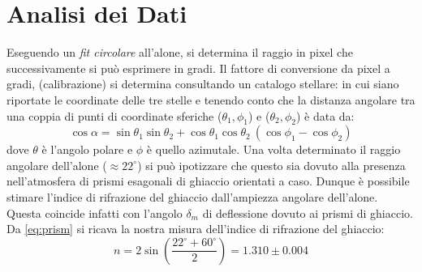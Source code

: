\documentclass{report}[a4paper,11pt]
\begin{document}
\section{Analisi dei Dati}
Eseguendo un \emph{fit circolare} all'alone, si determina il raggio in pixel che successivamente si pu\`o esprimere in gradi. Il fattore di conversione da pixel a gradi, (calibrazione) si determina consultando un catalogo stellare: \cite{stellarium} in cui siano riportate le coordinate delle tre stelle e tenendo conto che la distanza angolare tra una coppia di punti di coordinate sferiche ($\theta_1,\phi_1$) e ($\theta_2,\phi_2$) \`e data da:
\begin{equation}\label{eq: sphere}
\cos\alpha = \sin\theta_1\sin\theta_2 + \cos\theta_1\cos\theta_2 \: (\cos\phi_1 - \cos\phi_2)
\end{equation}
dove $\theta$ \`e l'angolo polare e $\phi$ \`e quello azimutale.
Una volta determinato il raggio angolare dell'alone ($\approx 22^\circ$) si pu\`o ipotizzare che questo sia dovuto alla presenza nell'atmosfera di prismi esagonali di ghiaccio orientati a caso. Dunque è possibile stimare l'indice di rifrazione del ghiaccio dall'ampiezza angolare dell'alone. Questa coincide infatti con l'angolo $\delta_m$ di deflessione dovuto ai prismi di ghiaccio. Da \eqref{eq:prism} si ricava la nostra misura dell'indice di rifrazione del ghiaccio:
\begin{equation}\label{eq: refr_ice}
n = 2 \sin{\left(\frac{22^\circ + 60^\circ}{2}\right)} = 1.310 \pm 0.004
\end{equation}

%

%

\medskip


\end{document}
